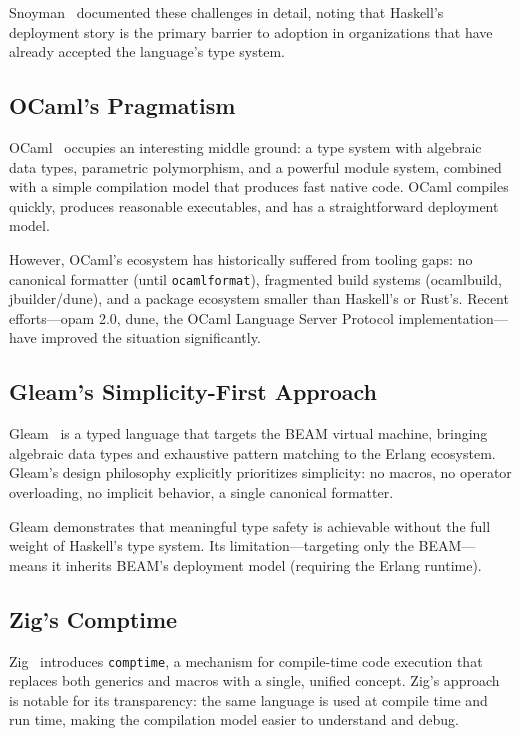 \documentclass[11pt,twocolumn]{article}
\begin{document}
Snoyman~\citep{snoyman2017haskell-deployment} documented these challenges in detail, noting that Haskell's deployment story is the primary barrier to adoption in organizations that have already accepted the language's type system.

\subsection{OCaml's Pragmatism}

OCaml~\citep{leroy2014ocaml} occupies an interesting middle ground: a type system with algebraic data types, parametric polymorphism, and a powerful module system, combined with a simple compilation model that produces fast native code.
OCaml compiles quickly, produces reasonable executables, and has a straightforward deployment model.

However, OCaml's ecosystem has historically suffered from tooling gaps: no canonical formatter (until \texttt{ocamlformat}), fragmented build systems (ocamlbuild, jbuilder/dune), and a package ecosystem smaller than Haskell's or Rust's.
Recent efforts---opam 2.0, dune, the OCaml Language Server Protocol implementation---have improved the situation significantly.

\subsection{Gleam's Simplicity-First Approach}

Gleam~\citep{gleam2023} is a typed language that targets the BEAM virtual machine, bringing algebraic data types and exhaustive pattern matching to the Erlang ecosystem.
Gleam's design philosophy explicitly prioritizes simplicity: no macros, no operator overloading, no implicit behavior, a single canonical formatter.

Gleam demonstrates that meaningful type safety is achievable without the full weight of Haskell's type system.
Its limitation---targeting only the BEAM---means it inherits BEAM's deployment model (requiring the Erlang runtime).

\subsection{Zig's Comptime}

Zig~\citep{kelley2020zig} introduces \texttt{comptime}, a mechanism for compile-time code execution that replaces both generics and macros with a single, unified concept.
Zig's approach is notable for its transparency: the same language is used at compile time and run time, making the compilation model easier to understand and debug.
\end{document}

